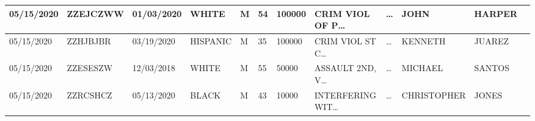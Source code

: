 \begin{table*}[!ht]
\begin{adjustbox}{max totalsize={.99\linewidth}{\textheight},center}
\begin{tabular}{|l|l|l|l|l|l|l|l|l|l|l|l|}
      05/15/2020             & ZZEJCZWW            & 01/03/2020   & WHITE         & M               & 54           & 100000        & CRIM VIOL OF P\dots  & \dots          & JOHN                & HARPER             \\ \hline
      05/15/2020             & ZZHJBJBR            & 03/19/2020   & HISPANIC      & M               & 35           & 100000        & CRIM VIOL ST C\dots  & \dots          & KENNETH             & JUAREZ             \\ \hline
      05/15/2020             & ZZESESZW            & 12/03/2018   & WHITE         & M               & 55           & 50000         & ASSAULT 2ND, V\dots  & \dots          & MICHAEL             & SANTOS             \\ \hline
      05/15/2020             & ZZRCSHCZ            & 05/13/2020   & BLACK         & M               & 43           & 10000         & INTERFERING WIT\dots & \dots          & CHRISTOPHER         & JONES              \\ \hline
    \end{tabular}
    \egroup
  \end{adjustbox}

\end{table*}
